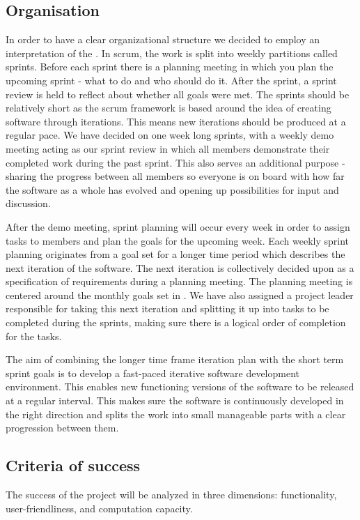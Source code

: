 \subsection{Organisation}
    In order to have a clear organizational structure we decided to employ an interpretation of the  \cite{scrum}. In scrum, the work is split into weekly partitions called sprints. Before each sprint there is a planning meeting in which you plan the upcoming sprint - what to do and who should do it. After the sprint, a sprint review is held to reflect about whether all goals were met. The sprints should be relatively short as the scrum framework is based around the idea of creating software through iterations. This means new iterations should be produced at a regular pace. We have decided on one week long sprints, with a weekly demo meeting acting as our sprint review in which all members demonstrate their completed work during the past sprint. This also serves an additional purpose - sharing the progress between all members so everyone is on board with how far the software as a whole has evolved and opening up possibilities for input and discussion.

    After the demo meeting, sprint planning will occur every week in order to assign tasks to members and plan the goals for the upcoming week. Each weekly sprint planning originates from a goal set for a longer time period which describes the next iteration of the software. The next iteration is collectively decided upon as a specification of requirements during a planning meeting. The planning meeting is centered around the monthly goals set in . We have also assigned a project leader responsible for taking this next iteration and splitting it up into tasks to be completed during the sprints, making sure there is a logical order of completion for the tasks.

    The aim of combining the longer time frame iteration plan with the short term sprint goals is to develop a fast-paced iterative software development environment. This enables new functioning versions of the software to be released at a regular interval. This makes sure the software is continuously developed in the right direction and splits the work into small manageable parts with a clear progression between them.

    

\subsection{Criteria of success}
The success of the project will be analyzed in three dimensions: functionality, user-friendliness, and computation capacity. 

